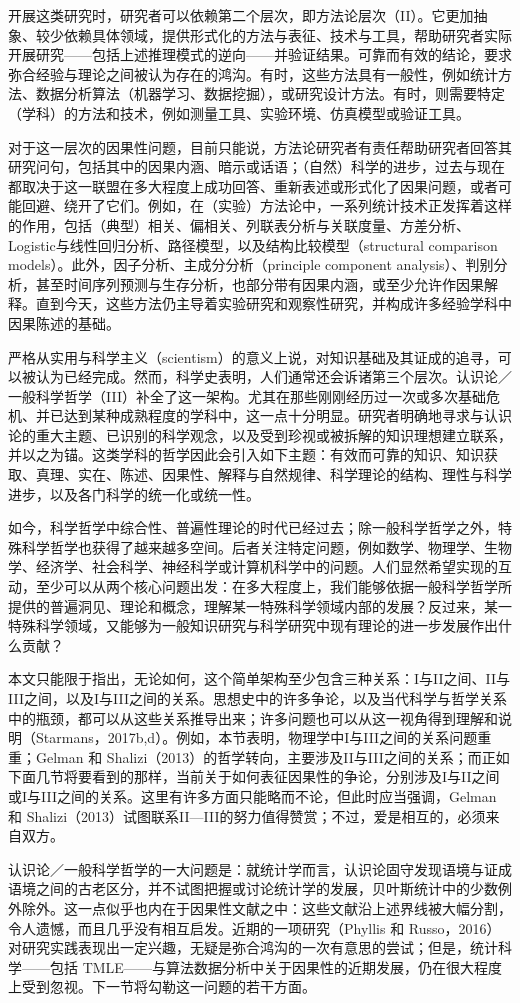 开展这类研究时，研究者可以依赖第二个层次，即方法论层次（II）。它更加抽象、较少依赖具体领域，提供形式化的方法与表征、技术与工具，帮助研究者实际开展研究——包括上述推理模式的逆向——并验证结果。可靠而有效的结论，要求弥合经验与理论之间被认为存在的鸿沟。有时，这些方法具有一般性，例如统计方法、数据分析算法（机器学习、数据挖掘），或研究设计方法。有时，则需要特定（学科）的方法和技术，例如测量工具、实验环境、仿真模型或验证工具。

对于这一层次的因果性问题，目前只能说，方法论研究者有责任帮助研究者回答其研究问句，包括其中的因果内涵、暗示或话语；（自然）科学的进步，过去与现在都取决于这一联盟在多大程度上成功回答、重新表述或形式化了因果问题，或者可能回避、绕开了它们。例如，在（实验）方法论中，一系列统计技术正发挥着这样的作用，包括（典型）相关、偏相关、列联表分析与关联度量、方差分析、Logistic与线性回归分析、路径模型，以及结构比较模型（structural comparison models）。此外，因子分析、主成分分析（principle component analysis）、判别分析，甚至时间序列预测与生存分析，也部分带有因果内涵，或至少允许作因果解释。直到今天，这些方法仍主导着实验研究和观察性研究，并构成许多经验学科中因果陈述的基础。

严格从实用与科学主义（scientism）的意义上说，对知识基础及其证成的追寻，可以被认为已经完成。然而，科学史表明，人们通常还会诉诸第三个层次。认识论／一般科学哲学（III）补全了这一架构。尤其在那些刚刚经历过一次或多次基础危机、并已达到某种成熟程度的学科中，这一点十分明显。研究者明确地寻求与认识论的重大主题、已识别的科学观念，以及受到珍视或被拆解的知识理想建立联系，并以之为锚。这类学科的哲学因此会引入如下主题：有效而可靠的知识、知识获取、真理、实在、陈述、因果性、解释与自然规律、科学理论的结构、理性与科学进步，以及各门科学的统一化或统一性。

如今，科学哲学中综合性、普遍性理论的时代已经过去；除一般科学哲学之外，特殊科学哲学也获得了越来越多空间。后者关注特定问题，例如数学、物理学、生物学、经济学、社会科学、神经科学或计算机科学中的问题。人们显然希望实现的互动，至少可以从两个核心问题出发：在多大程度上，我们能够依据一般科学哲学所提供的普遍洞见、理论和概念，理解某一特殊科学领域内部的发展？反过来，某一特殊科学领域，又能够为一般知识研究与科学研究中现有理论的进一步发展作出什么贡献？

本文只能限于指出，无论如何，这个简单架构至少包含三种关系：I与II之间、II与III之间，以及I与III之间的关系。思想史中的许多争论，以及当代科学与哲学关系中的瓶颈，都可以从这些关系推导出来；许多问题也可以从这一视角得到理解和说明（Starmans，2017b,d）。例如，本节表明，物理学中I与III之间的关系问题重重；Gelman 和 Shalizi（2013）的哲学转向，主要涉及II与III之间的关系；而正如下面几节将要看到的那样，当前关于如何表征因果性的争论，分别涉及I与II之间或I与III之间的关系。这里有许多方面只能略而不论，但此时应当强调，Gelman 和 Shalizi（2013）试图联系II—III的努力值得赞赏；不过，爱是相互的，必须来自双方。

认识论／一般科学哲学的一大问题是：就统计学而言，认识论固守发现语境与证成语境之间的古老区分，并不试图把握或讨论统计学的发展，贝叶斯统计中的少数例外除外。这一点似乎也内在于因果性文献之中：这些文献沿上述界线被大幅分割，令人遗憾，而且几乎没有相互启发。近期的一项研究（Phyllis 和 Russo，2016）对研究实践表现出一定兴趣，无疑是弥合鸿沟的一次有意思的尝试；但是，统计科学——包括 TMLE——与算法数据分析中关于因果性的近期发展，仍在很大程度上受到忽视。下一节将勾勒这一问题的若干方面。
